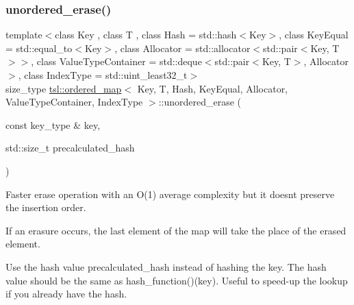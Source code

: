 \subsubsection{\texorpdfstring{unordered\_erase()}{unordered\_erase()}\hspace{0.1cm}{\footnotesize\ttfamily [4/6]}}
{\footnotesize\ttfamily template$<$class Key , class T , class Hash  = std\+::hash$<$\+Key$>$, class Key\+Equal  = std\+::equal\+\_\+to$<$\+Key$>$, class Allocator  = std\+::allocator$<$std\+::pair$<$\+Key, T$>$$>$, class Value\+Type\+Container  = std\+::deque$<$std\+::pair$<$\+Key, T$>$, Allocator$>$, class Index\+Type  = std\+::uint\+\_\+least32\+\_\+t$>$ \\
size\+\_\+type \mbox{\hyperlink{classtsl_1_1ordered__map}{tsl\+::ordered\+\_\+map}}$<$ Key, T, Hash, Key\+Equal, Allocator, Value\+Type\+Container, Index\+Type $>$\+::unordered\+\_\+erase (\begin{DoxyParamCaption}\item[{const key\+\_\+type \&}]{key,  }\item[{std\+::size\+\_\+t}]{precalculated\+\_\+hash }\end{DoxyParamCaption})\hspace{0.3cm}{\ttfamily [inline]}}





Faster erase operation with an O(1) average complexity but it doesn\textquotesingle{}t preserve the insertion order.

If an erasure occurs, the last element of the map will take the place of the erased element.

Use the hash value \textquotesingle{}precalculated\+\_\+hash\textquotesingle{} instead of hashing the key. The hash value should be the same as hash\+\_\+function()(key). Useful to speed-\/up the lookup if you already have the hash. \mbox{\label{classtsl_1_1ordered__map_aac95431ce5de6d457355292a8230eb98}} 
